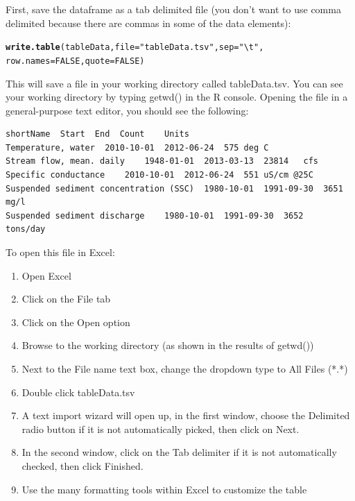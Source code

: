 \documentclass[a4paper,11pt]{article}\usepackage{graphicx, color}
\makeatletter
\newcommand{\hlfunctioncall}[1]{\textcolor[rgb]{0.501960784313725,0,0.329411764705882}{\textbf{#1}}}%
\newcommand{\hlstring}[1]{\textcolor[rgb]{0.6,0.6,1}{#1}}%
\newenvironment{kframe}{%
 \def\at@end@of@kframe{}%
 \ifinner\ifhmode%
  \def\at@end@of@kframe{\end{minipage}}%
  \begin{minipage}{\columnwidth}%
 \fi\fi%
 \def\FrameCommand##1{\hskip\@totalleftmargin \hskip-\fboxsep
 \colorbox{shadecolor}{##1}\hskip-\fboxsep
     \hskip-\linewidth \hskip-\@totalleftmargin \hskip\columnwidth}%
 \MakeFramed {\advance\hsize-\width
   \@totalleftmargin\z@ \linewidth\hsize
   \@setminipage}}%
 {\par\unskip\endMakeFramed%
 \at@end@of@kframe}
\newenvironment{knitrout}{}{} %
\makeatother
\begin{document}
First, save the dataframe as a tab delimited file (you don't want to use comma delimited because there are commas in some of the data elements):


\begin{knitrout}
\color{fgcolor}\begin{kframe}
\begin{alltt}
\hlfunctioncall{write.table}(tableData, file=\hlstring{"tableData.tsv"},sep=\hlstring{"\textbackslash{}t"}, 
            row.names = FALSE,quote=FALSE)
\end{alltt}
\end{kframe}
\end{knitrout}


This will save a file in your working directory called tableData.tsv.  You can see your working directory by typing getwd() in the R console. Opening the file in a general-purpose text editor, you should see the following:

\begin{verbatim}
shortName  Start  End  Count	Units
Temperature, water	2010-10-01	2012-06-24	575	deg C
Stream flow, mean. daily	1948-01-01	2013-03-13	23814	cfs
Specific conductance	2010-10-01	2012-06-24	551	uS/cm @25C
Suspended sediment concentration (SSC)	1980-10-01	1991-09-30	3651	mg/l
Suspended sediment discharge	1980-10-01	1991-09-30	3652	tons/day
\end{verbatim}

To open this file in Excel:
\begin{enumerate}
\item Open Excel
\item Click on the File tab
\item Click on the Open option
\item Browse to the working directory (as shown in the results of getwd())
\item Next to the File name text box, change the dropdown type to All Files (*.*)
\item Double click tableData.tsv
\item A text import wizard will open up, in the first window, choose the Delimited radio button if it is not automatically picked, then click on Next.
\item In the second window, click on the Tab delimiter if it is not automatically checked, then click Finished.
\item Use the many formatting tools within Excel to customize the table
\end{enumerate}
\end{document}

